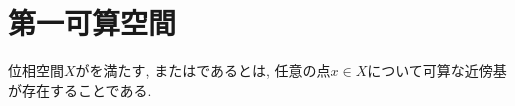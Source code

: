 \documentclass[uplatex, dvipdfmx, a4paper, 12pt, class=jsbook, crop=false]{standalone}
\begin{document}
\section{第一可算空間}
\label{sec:first-countable-spaces}

\begin{definition}
	位相空間$ X $がを満たす,
	またはであるとは,
	任意の点$ x \in X $について可算な近傍基が存在することである.
\end{definition}
\end{document}
